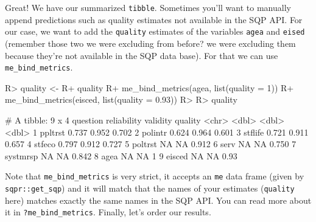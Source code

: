 \documentclass[
]{jss}
\begin{document}
Great! We have our summarized \texttt{tibble}. Sometimes you'll want to
manually append predictions such as quality estimates not available in
the SQP API. For our case, we want to add the \texttt{quality} estimates
of the variables \texttt{agea} and \texttt{eised} (remember those two we
were excluding from before? we were excluding them because they're not
available in the SQP data base). For that we can use
\texttt{me\_bind\_metrics}.

\begin{CodeChunk}

\begin{CodeInput}
R> quality <-
R+   quality %
R+   me_bind_metrics(agea, list(quality = 1)) %
R+   me_bind_metrics(eisced, list(quality = 0.93))
R> 
R> quality
\end{CodeInput}

\begin{CodeOutput}
# A tibble: 9 x 4
  question reliability validity quality
  <chr>          <dbl>    <dbl>   <dbl>
1 ppltrst        0.737    0.952   0.702
2 polintr        0.624    0.964   0.601
3 stflife        0.721    0.911   0.657
4 stfeco         0.797    0.912   0.727
5 poltrst       NA       NA       0.912
6 serv          NA       NA       0.750
7 systmrsp      NA       NA       0.842
8 agea          NA       NA       1    
9 eisced        NA       NA       0.93 
\end{CodeOutput}
\end{CodeChunk}

Note that \texttt{me\_bind\_metrics} is very strict, it accepts an
\texttt{me} data frame (given by \texttt{sqpr::get\_sqp}) and it will
match that the names of your estimates (\texttt{quality} here) matches
exactly the same names in the SQP API. You can read more about it in
\texttt{?me\_bind\_metrics}. Finally, let's order our results.

\begin{CodeChunk}

\end{CodeChunk}
\end{document}
